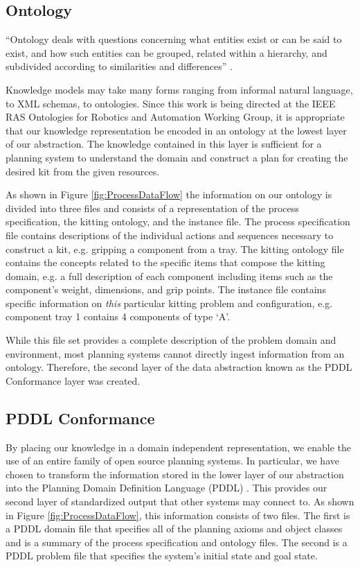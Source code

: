 \documentclass[a4paper, 10pt, conference]{ieeeconf}      %
\begin{document}
\subsection{Ontology}
``Ontology deals with questions concerning what entities exist or can be said to exist, and how such entities can be grouped, related within a hierarchy, and subdivided according to similarities and differences'' \cite{ontologyDef}.

Knowledge models may take many forms ranging from informal natural language, to XML schemas, to ontologies.
Since this work is being directed at the IEEE RAS Ontologies for Robotics and Automation Working Group, it is appropriate that our  knowledge representation be
encoded in an ontology at the lowest layer of our abstraction. The knowledge contained in this layer is sufficient for a planning system to understand the domain and construct
a plan for creating the desired kit from the given resources.

As shown in Figure \ref{fig:ProcessDataFlow} the information on our ontology is divided into three files and consists of a representation of the process specification,
the kitting ontology, and the instance file. The process specification file contains descriptions of
the individual actions and sequences necessary to construct a kit, e.g. gripping a component from a tray. The kitting ontology file contains the concepts related to the specific items
that compose the kitting domain, e.g. a full description of each component including items such as the component's weight, dimensions, and grip points. The instance file
contains specific information on {\it this} particular kitting problem and configuration, e.g. component tray 1 contains 4 components of type `A'.

While this file set provides a complete description of the problem domain and environment, most planning systems cannot directly ingest information from an ontology.
Therefore, the second layer of the data abstraction known as the PDDL Conformance layer was created.

\subsection{PDDL Conformance}
By placing our knowledge in a domain independent representation, we enable the use of an entire family of open source planning systems.
In particular, we have chosen to transform the information stored in the lower layer of our abstraction into the Planning Domain Definition Language (PDDL) \cite{PDDL}.
This provides our second layer of standardized output that other systems may connect to. As shown in Figure \ref{fig:ProcessDataFlow}, this information consists of two files. The first
is a PDDL domain file that specifies all of the planning axioms and object classes and is a summary of the process specification and ontology files. The second is a PDDL problem file that
specifies the system's initial state and goal state.
\end{document}
